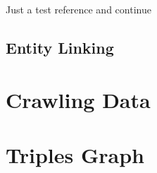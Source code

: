 \documentclass[11pt,a4paper]{article}
\begin{document}
Just a test reference\citep{Ando2005} and continue

\subsection{Entity Linking}
\label{subsec:ent_linking}


\section{Crawling Data}
\label{sec:crawl}


\section{Triples Graph}
\label{sec:triples_graph}



\end{document}
